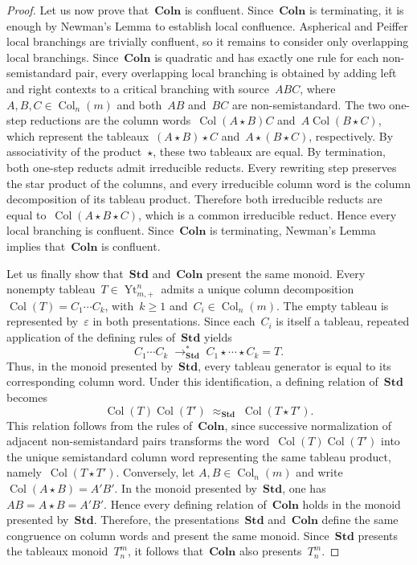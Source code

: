 \documentclass[a4paper, twoside, 11pt, english]{article}
\theoremstyle{plain}
\theoremstyle{definition}
\newcommand{\fl}{\rightarrow}
\DeclareMathOperator{\YoungT}{Yt}
\DeclareMathOperator{\col}{Col}
\newcommand{\Colo}{\mathbf{Coln}}
\newcommand{\Std}{\mathbf{Std}}
\begin{document}
\begin{proof}
Let us now prove that~$\Colo$ is confluent.
Since~$\Colo$ is terminating, it is enough by Newman's Lemma to establish local confluence.
Aspherical and Peiffer local branchings are trivially confluent, so it remains to consider only overlapping local branchings.
Since~$\Colo$ is quadratic and has exactly one rule for each non-semistandard pair, every overlapping local branching is obtained by adding left and right contexts to a critical branching with source~$ABC$, where~$A,B,C\in\col_n(m)$ and both~$AB$ and~$BC$ are non-semistandard.
The two one-step reductions are the column words~$\col(A\star B)C$ and~$A\col(B\star C)$, which represent the tableaux~$(A\star B)\star C$ and~$A\star(B\star C)$, respectively.
By associativity of the product~$\star$, these two tableaux are equal.
By termination, both one-step reducts admit irreducible reducts.
Every rewriting step preserves the star product of the columns,
and every irreducible column word is the column decomposition
of its tableau product.
Therefore both irreducible reducts are equal to~$\col(A\star B\star C)$, which is a common irreducible reduct.
Hence every local branching is confluent.
Since~$\Colo$ is terminating, Newman's Lemma implies that~$\Colo$ is confluent.


Let us finally show that~$\Std$ and~$\Colo$ present the same monoid.
Every nonempty tableau~$T\in\YoungT_{m,+}^n$ admits a unique column decomposition~$\col(T)=C_1\cdots C_k$, with~$k\ge1$ and~$C_i\in\col_n(m)$. The empty tableau is represented by~$\varepsilon$ in both
presentations.
Since each~$C_i$ is itself a tableau, repeated application of the defining rules of~$\Std$ yields
\[
C_1\cdots C_k \;\fl_\Std^\ast\; C_1\star\cdots\star C_k = T.
\]
Thus, in the monoid presented by~$\Std$, every tableau generator is equal to its corresponding column word.
Under this identification, a defining relation of~$\Std$ becomes
\[
\col(T)\col(T') \;\approx_\Std\; \col(T\star T').
\]
This relation follows from the rules of~$\Colo$, since successive normalization of adjacent non-semistandard pairs transforms the word~$\col(T)\col(T')$ into the unique semistandard column word representing the same tableau product, namely~$\col(T\star T')$.
Conversely, let $A,B\in\col_n(m)$ and write~$\col(A\star B)=A'B'$.
In the monoid presented by~$\Std$, one has~$AB = A\star B = A'B'$.
Hence every defining relation of~$\Colo$ holds in the monoid presented by~$\Std$.
Therefore, the presentations~$\Std$ and~$\Colo$ define the same congruence on column words and present the same monoid.
Since~$\Std$ presents the tableaux monoid~$T_n^m$, it follows that~$\Colo$ also presents~$T_n^m$.
\end{proof}
\end{document}
